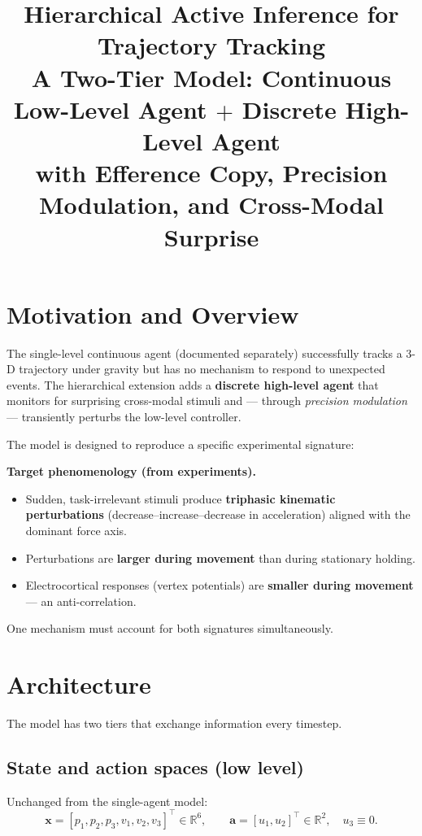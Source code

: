 \documentclass[11pt, a4paper]{article}
\title{%
  \textbf{\Large Hierarchical Active Inference for Trajectory Tracking}\\[4pt]
  \large A Two-Tier Model: Continuous Low-Level Agent
  $+$ Discrete High-Level Agent\\[2pt]
  \normalsize with Efference Copy, Precision Modulation,
  and Cross-Modal Surprise
}
\author{}
\date{}
\newcommand{\vect}[1]{\bm{#1}}
\begin{document}
\maketitle\thispagestyle{empty}
\tableofcontents\newpage

\section{Motivation and Overview}

The single-level continuous agent (documented separately) successfully tracks
a 3-D trajectory under gravity but has no mechanism to respond to unexpected
events. The hierarchical extension adds a \textbf{discrete high-level agent}
that monitors for surprising cross-modal stimuli and — through
\emph{precision modulation} — transiently perturbs the low-level controller.

The model is designed to reproduce a specific experimental signature:

\begin{resultbox}
\textbf{Target phenomenology (from experiments).}
\begin{itemize}[noitemsep]
  \item Sudden, task-irrelevant stimuli produce \textbf{triphasic kinematic
        perturbations} (decrease–increase–decrease in acceleration) aligned
        with the dominant force axis.
  \item Perturbations are \textbf{larger during movement} than during
        stationary holding.
  \item Electrocortical responses (vertex potentials) are
        \textbf{smaller during movement} — an anti-correlation.
\end{itemize}
One mechanism must account for both signatures simultaneously.
\end{resultbox}

\section{Architecture}

The model has two tiers that exchange information every timestep.

\subsection{State and action spaces (low level)}
Unchanged from the single-agent model:
\begin{equation}
  \vect{x} = [p_1, p_2, p_3, v_1, v_2, v_3]^\top \in \mathbb{R}^6,
  \qquad
  \vect{a} = [u_1, u_2]^\top \in \mathbb{R}^2, \quad u_3 \equiv 0.
\end{equation}
\end{document}
